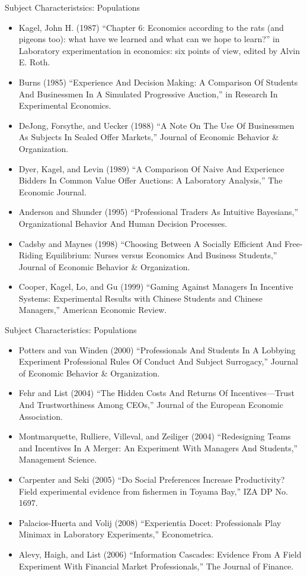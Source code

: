 \documentclass{beamer}
\begin{document}
\begin{frame}{Subject Characteristsics: Populations}
\tiny
	\begin{itemize}
		\item Kagel, John H. (1987) ``Chapter 6: Economics according to the rats (and pigeons too): what have we learned and what can we hope to learn?'' in Laboratory experimentation in economics: six points of view, edited by Alvin E. Roth.
		\item Burns (1985) ``Experience And Decision Making: A Comparison Of Students And Businessmen In A Simulated Progressive Auction,'' in Research In Experimental Economics.
		\item DeJong, Forsythe, and Uecker (1988) ``A Note On The Use Of Businessmen As Subjects In Sealed Offer Markets,'' Journal of Economic Behavior \& Organization.
		\item Dyer, Kagel, and Levin (1989) ``A Comparison Of Naive And Experience Bidders In Common Value Offer Auctions: A Laboratory Analysis,'' The Economic Journal.
		\item Anderson and Shunder (1995) ``Professional Traders As Intuitive Bayesians,'' Organizational Behavior And Human Decision Processes.
		\item Cadsby and Maynes (1998) ``Choosing Between A Socially Efficient And Free-Riding Equilibrium: Nurses versus Economics And Business Students,'' Journal of Economic Behavior \& Organization.
		\item Cooper, Kagel, Lo, and Gu (1999) ``Gaming Against Managers In Incentive Systems: Experimental Results with Chinese Students and Chinese Managers,'' American Economic Review.
	\end{itemize}
\end{frame}

\begin{frame}{Subject Characteristics: Populations}
\tiny
	\begin{itemize}
		\item Potters and van Winden (2000) ``Professionals And Students In A Lobbying Experiment Professional Rules Of Conduct And Subject Surrogacy,'' Journal of Economic Behavior \& Organization.
		\item Fehr and List (2004) ``The Hidden Costs And Returns Of Incentives---Trust And Trustworthiness Among CEOs,'' Journal of the European Economic Association.
		\item Montmarquette, Rulliere, Villeval, and Zeiliger (2004) ``Redesigning Teams and Incentives In A Merger: An Experiment With Managers And Students,'' Management Science.
		\item Carpenter and Seki (2005) ``Do Social Preferences Increase Productivity? Field experimental evidence from fishermen in Toyama Bay,'' IZA DP No. 1697.
		\item Palacios-Huerta and Volij (2008) ``Experientia Docet: Professionals Play Minimax in Laboratory Experiments,'' Econometrica.
		\item Alevy, Haigh, and List (2006) ``Information Cascades: Evidence From A Field Experiment With Financial Market Professionals,'' The Journal of Finance.
	\end{itemize}
\end{frame}
\end{document}
